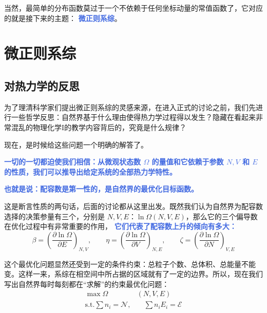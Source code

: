 \documentclass[hyperref,UTF-8]{ctexbook}
\newcommand{\0}{\boldsymbol{0}}
\begin{document}
当然，最简单的分布函数莫过于一个不依赖于任何坐标动量的常值函数了，它对应的就是接下来的主题： \textcolor{RoyalBlue}{\textbf{\kaishu 微正则系综}}。



\section{微正则系综}\label{sec:微正则系综}

\subsection{对热力学的反思}

为了理清科学家们提出微正则系综的灵感来源，在进入正式的讨论之前，我们先进行一些哲学反思：自然界基于什么理由使得热力学过程得以发生？隐藏在看起来非常混乱的物理化学I的教学内容背后的，究竟是什么规律？

现在，是时候给这些问题一个明确的解答了。

\textcolor{RoyalBlue}{\textbf{\kaishu 一切的一切都迫使我们相信：从微观状态数 $\Omega$ 的量值和它依赖于参数 $N,V$ 和 $E$ 的性质，我们可以推导出给定系统的全部热力学特性。}}

\textcolor{RoyalBlue}{\textbf{\kaishu 也就是说：配容数是第一性的，是自然界的最优化目标函数。}}

这是断言性质的两句话，后面的讨论都从这里出发。既然我们认为自然界为配容数选择的决策参量有三个，分别是 $N,V,E$：$\ln\Omega(N,V,E)$，那么它的三个偏导数在优化过程中有非常重要的作用， \textcolor{RoyalBlue}{\textbf{\kaishu 它们代表了配容数上升的倾向有多大：}} 
\begin{equation}
    \beta = \left(\frac{\partial \ln\Omega}{\partial E}\right)_{N,V},\quad\quad \eta = \left(\frac{\partial \ln\Omega}{\partial V}\right)_{N,E},\quad\quad \zeta = \left(\frac{\partial \ln\Omega}{\partial N}\right)_{V,E}
\end{equation}

这个最优化问题显然还受到一定的条件约束：总粒子个数、总体积、总能量不能变。这样一来，系综在相空间中所占据的区域就有了一定的边界。所以，现在我们写出自然界每时每刻都在“求解”的约束最优化问题：
\begin{equation}\label{equ:optimizeI}
    \begin{split}
        \max \Omega&(N,V,E)\\
        \text{s.t.}\sum n_i = \mathcal{N},&\quad\sum n_iE_i = \mathcal{E}
    \end{split}
\end{equation}
\end{document}
